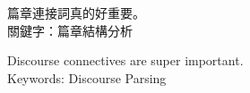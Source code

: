 \begin{abstractzh}

篇章連接詞真的好重要。\\

\noindent
關鍵字：篇章結構分析

\end{abstractzh}

\begin{abstracten}

Discourse connectives are super important.  \\ 

\noindent
Keywords: Discourse Parsing
\end{abstracten}

